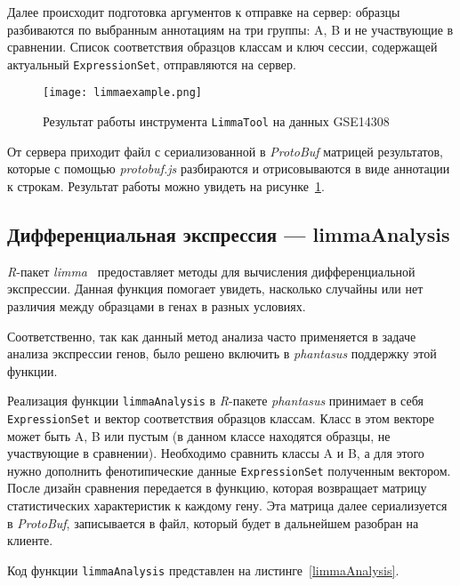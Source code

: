 Далее происходит подготовка аргументов к отправке на сервер: образцы разбиваются по выбранным аннотациям на три группы: A, B и не участвующие в сравнении.
Список соответствия образцов классам и ключ сессии, содержащей актуальный \texttt{ExpressionSet}, отправляются на сервер.

\begin{figure}[h]
  \caption{Результат работы инструмента \texttt{LimmaTool} на данных GSE14308}
  \texttt{[image: limmaexample.png]}
  \label{limmaexample}
\end{figure}

От сервера приходит файл с сериализованной в \emph{ProtoBuf} матрицей результатов, которые с помощью \emph{protobuf.js} разбираются и отрисовываются в виде аннотации к строкам. Результат работы можно увидеть на рисунке~\ref{limmaexample}.
\subsection{Дифференциальная экспрессия --- limmaAnalysis}
\emph{R}-пакет \emph{limma}~\cite{limma} предоставляет методы для вычисления дифференциальной экспрессии. Данная функция помогает увидеть, насколько случайны или нет различия между образцами в генах в разных условиях.

Соответственно, так как данный метод анализа часто применяется в задаче анализа экспрессии генов, было решено включить в \emph{phantasus} поддержку этой функции.

Реализация функции \texttt{limmaAnalysis} в \emph{R}-пакете \emph{phantasus} принимает в себя \texttt{ExpressionSet} и вектор соответствия образцов классам. Класс в этом векторе может быть A, B или пустым (в данном классе находятся образцы, не участвующие в сравнении). Необходимо сравнить классы A и B, а для этого нужно дополнить фенотипические данные \texttt{ExpressionSet} полученным вектором.
После дизайн сравнения передается в функцию, которая возвращает матрицу статистических характеристик к каждому гену.
Эта матрица далее сериализуется в \emph{ProtoBuf}, записывается в файл, который будет в дальнейшем разобран на клиенте.

Код функции \texttt{limmaAnalysis} представлен на листинге~\ref{limmaAnalysis}.

